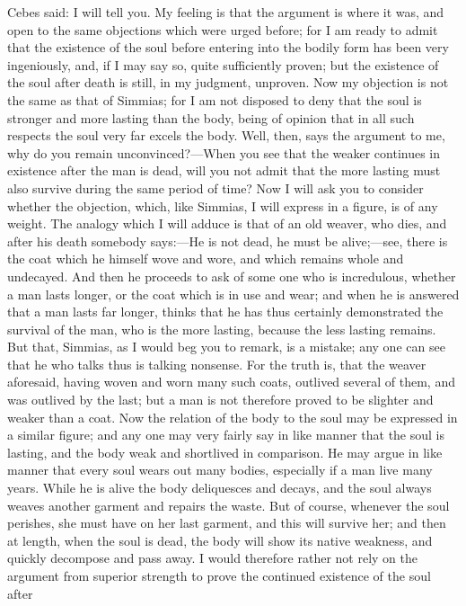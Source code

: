 Cebes said: I will tell you. My feeling is that the argument is where it
was, and open to the same objections which were urged before; for I am
ready to admit that the existence of the soul before entering into the
bodily form has been very ingeniously, and, if I may say so, quite
sufficiently proven; but the existence of the soul after death is still,
in my judgment, unproven. Now my objection is not the same as that of
Simmias; for I am not disposed to deny that the soul is stronger and more
lasting than the body, being of opinion that in all such respects the soul
very far excels the body. Well, then, says the argument to me, why do you
remain unconvinced?—When you see that the weaker continues in
existence after the man is dead, will you not admit that the more lasting
must also survive during the same period of time? Now I will ask you to
consider whether the objection, which, like Simmias, I will express in a
figure, is of any weight. The analogy which I will adduce is that of an
old weaver, who dies, and after his death somebody says:—He is not
dead, he must be alive;—see, there is the coat which he himself wove
and wore, and which remains whole and undecayed. And then he proceeds to
ask of some one who is incredulous, whether a man lasts longer, or the
coat which is in use and wear; and when he is answered that a man lasts
far longer, thinks that he has thus certainly demonstrated the survival of
the man, who is the more lasting, because the less lasting remains. But
that, Simmias, as I would beg you to remark, is a mistake; any one can see
that he who talks thus is talking nonsense. For the truth is, that the
weaver aforesaid, having woven and worn many such coats, outlived several
of them, and was outlived by the last; but a man is not therefore proved
to be slighter and weaker than a coat. Now the relation of the body to the
soul may be expressed in a similar figure; and any one may very fairly say
in like manner that the soul is lasting, and the body weak and shortlived
in comparison. He may argue in like manner that every soul wears out many
bodies, especially if a man live many years. While he is alive the body
deliquesces and decays, and the soul always weaves another garment and
repairs the waste. But of course, whenever the soul perishes, she must
have on her last garment, and this will survive her; and then at length,
when the soul is dead, the body will show its native weakness, and quickly
decompose and pass away. I would therefore rather not rely on the argument
from superior strength to prove the continued existence of the soul after

